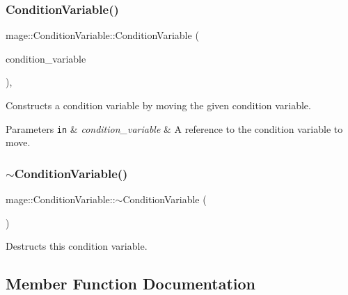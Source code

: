 \subsubsection{\texorpdfstring{Condition\+Variable()}{ConditionVariable()}\hspace{0.1cm}{\footnotesize\ttfamily [3/3]}}
{\footnotesize\ttfamily mage\+::\+Condition\+Variable\+::\+Condition\+Variable (\begin{DoxyParamCaption}\item[{\hyperlink{structmage_1_1_condition_variable}{Condition\+Variable} \&\&}]{condition\+\_\+variable }\end{DoxyParamCaption})\hspace{0.3cm}{\ttfamily [default]}, {\ttfamily [noexcept]}}

Constructs a condition variable by moving the given condition variable.


\begin{DoxyParams}[1]{Parameters}
\mbox{\tt in}  & {\em condition\+\_\+variable} & A reference to the condition variable to move. \\
\hline
\end{DoxyParams}
\hypertarget{structmage_1_1_condition_variable_accd5253beb65b2904428afdb889cf00b}{}\label{structmage_1_1_condition_variable_accd5253beb65b2904428afdb889cf00b} 
\subsubsection{\texorpdfstring{$\sim$\+Condition\+Variable()}{~ConditionVariable()}}
{\footnotesize\ttfamily mage\+::\+Condition\+Variable\+::$\sim$\+Condition\+Variable (\begin{DoxyParamCaption}{ }\end{DoxyParamCaption})}

Destructs this condition variable. 

\subsection{Member Function Documentation}
\hypertarget{structmage_1_1_condition_variable_aab712c41e76c444606d5419a20d87b7a}{}\label{structmage_1_1_condition_variable_aab712c41e76c444606d5419a20d87b7a} 
